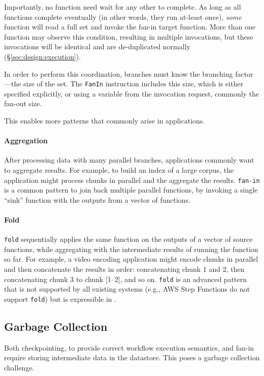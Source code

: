Importantly, no function need wait for any other to complete. As long as all
functions complete eventually (in other words, they run at-least once),
\emph{some} function will read a full set and invoke the fan-in target function.
More than one function may observe this condition, resulting in multiple
invocations, but these invocations will be identical and are de-duplicated
normally (\S\ref{sec:design:execution}).

In order to perform this coordination, branches must know the branching
factor---the size of the set. The \texttt{FanIn} instruction includes this size,
which is either specified explicitly, or using a variable from the invocation
request, commonly the fan-out size.


This enables more patterns that commonly arise in applications.

\paragraph{Aggregation}
After processing data with many parallel branches, applications commonly want to
aggregate results. For example, to build an index of a large corpus, the
application might process chunks in parallel and the aggregate the results.
\texttt{fan-in} is a common pattern to join back multiple parallel functions, by
invoking a single ``sink'' function with the outputs from a vector of functions.

\paragraph{Fold}
\texttt{fold} sequentially applies the same function on the outputs of a vector
of source functions, while aggregating with the intermediate results of running
the function so far. For example, a video encoding application might encode
chunks in parallel and then concatenate the results in order: concatenating
chunk 1 and 2, then concatenating chunk 3 to chunk [1--2], and so on.
\texttt{fold} is an advanced pattern that is not supported by all existing
systems (e.g., AWS Step Functions do not support \texttt{fold}) but is
expressible in \name{}.


\subsection{Garbage Collection}\label{sec:design:garbage}

Both checkpointing, to provide correct workflow execution semantics, and fan-in
require storing intermediate data in the datastore. This poses a garbage
collection challenge.


